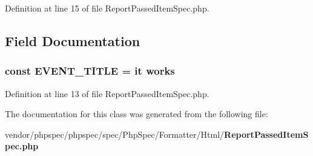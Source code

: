Definition at line 15 of file Report\+Passed\+Item\+Spec.\+php.



\subsection{Field Documentation}
\subsubsection[{E\+V\+E\+N\+T\+\_\+\+T\+I\+T\+L\+E}]{\setlength{\rightskip}{0pt plus 5cm}const E\+V\+E\+N\+T\+\_\+\+T\+I\+T\+L\+E = \textquotesingle{}it works\textquotesingle{}}\label{classspec_1_1_php_spec_1_1_formatter_1_1_html_1_1_report_passed_item_spec_ac15e1884cc3d167b7fb38cbdc5646050}


Definition at line 13 of file Report\+Passed\+Item\+Spec.\+php.



The documentation for this class was generated from the following file\+:\begin{DoxyCompactItemize}
\item 
vendor/phpspec/phpspec/spec/\+Php\+Spec/\+Formatter/\+Html/{\bf Report\+Passed\+Item\+Spec.\+php}\end{DoxyCompactItemize}
